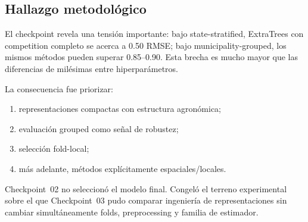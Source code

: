 \subsection{Hallazgo metodológico}

El checkpoint revela una tensión importante: bajo state-stratified, ExtraTrees con competition
completo se acerca a 0.50 RMSE; bajo municipality-grouped, los mismos métodos pueden superar
0.85--0.90. Esta brecha es mucho mayor que las diferencias de milésimas entre
hiperparámetros.

La consecuencia fue priorizar:
\begin{enumerate}
\item representaciones compactas con estructura agronómica;
\item evaluación grouped como señal de robustez;
\item selección fold-local;
\item más adelante, métodos explícitamente espaciales/locales.
\end{enumerate}

Checkpoint~02 no seleccionó el modelo final. Congeló el terreno experimental sobre el que
Checkpoint~03 pudo comparar ingeniería de representaciones sin cambiar simultáneamente folds,
preprocessing y familia de estimador.
